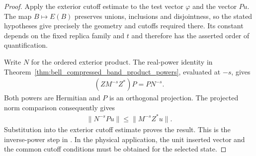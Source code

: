 \begin{proof}
    \leanok
    Apply the exterior cutoff estimate to the test vector $\varphi$ and
    the vector $Pu$. The map $B\mapsto E(B)$ preserves unions, inclusions
    and disjointness, so the stated hypotheses give precisely the
    geometry and cutoffs required there. Its constant depends on the
    fixed replica family and $t$ and therefore has the asserted order of
    quantification.

    Write $N$ for the ordered exterior product. The real-power identity
    in Theorem~\ref{thm:bell_compressed_band_product_powers}, evaluated at
    $-s$, gives
    \begin{align*}
        (ZM^{-s}Z^*)P=PN^{-s}.
    \end{align*}
    Both powers are Hermitian and $P$ is an orthogonal projection.
    The projected norm comparison consequently gives
    \begin{align*}
        \|N^{-s}Pu\|\le\|M^{-s}Z^*u\|.
    \end{align*}
    Substitution into the exterior cutoff estimate proves the result.
    This is the inverse-power step in
    \cite[\texttt{07-comparators.tex}, lines 299--308 and 370--381]{OpenAI2026AreaLaw}.
    In the physical application, the unit inserted vector and the
    common cutoff conditions must be obtained for the selected state.
\end{proof}
